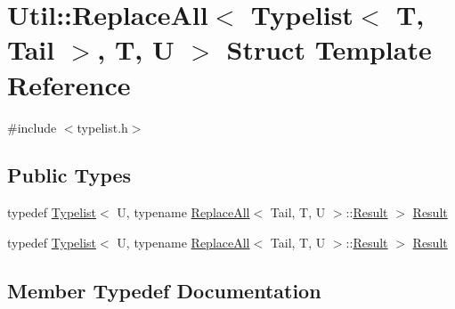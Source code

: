 \hypertarget{structUtil_1_1TL_1_1ReplaceAll_3_01Typelist_3_01T_00_01Tail_01_4_00_01T_00_01U_01_4}{}\section{Util\+:\+:Replace\+All$<$ Typelist$<$ T, Tail $>$, T, U $>$ Struct Template Reference}
\label{structUtil_1_1TL_1_1ReplaceAll_3_01Typelist_3_01T_00_01Tail_01_4_00_01T_00_01U_01_4}


{\ttfamily \#include $<$typelist.\+h$>$}

\subsection*{Public Types}
\begin{DoxyCompactItemize}
\item 
typedef \mbox{\hyperlink{structUtil_1_1Typelist}{Typelist}}$<$ U, typename \mbox{\hyperlink{structUtil_1_1TL_1_1ReplaceAll}{Replace\+All}}$<$ Tail, T, U $>$\+::\mbox{\hyperlink{structUtil_1_1TL_1_1ReplaceAll_3_01Typelist_3_01T_00_01Tail_01_4_00_01T_00_01U_01_4_ac7e5d69efc7e252ec9e6db5a6885ac44}{Result}} $>$ \mbox{\hyperlink{structUtil_1_1TL_1_1ReplaceAll_3_01Typelist_3_01T_00_01Tail_01_4_00_01T_00_01U_01_4_ac7e5d69efc7e252ec9e6db5a6885ac44}{Result}}
\item 
typedef \mbox{\hyperlink{structUtil_1_1Typelist}{Typelist}}$<$ U, typename \mbox{\hyperlink{structUtil_1_1TL_1_1ReplaceAll}{Replace\+All}}$<$ Tail, T, U $>$\+::\mbox{\hyperlink{structUtil_1_1TL_1_1ReplaceAll_3_01Typelist_3_01T_00_01Tail_01_4_00_01T_00_01U_01_4_ac7e5d69efc7e252ec9e6db5a6885ac44}{Result}} $>$ \mbox{\hyperlink{structUtil_1_1TL_1_1ReplaceAll_3_01Typelist_3_01T_00_01Tail_01_4_00_01T_00_01U_01_4_ac7e5d69efc7e252ec9e6db5a6885ac44}{Result}}
\end{DoxyCompactItemize}


\subsection{Member Typedef Documentation}
\mbox{\label{structUtil_1_1TL_1_1ReplaceAll_3_01Typelist_3_01T_00_01Tail_01_4_00_01T_00_01U_01_4_ac7e5d69efc7e252ec9e6db5a6885ac44}} 
